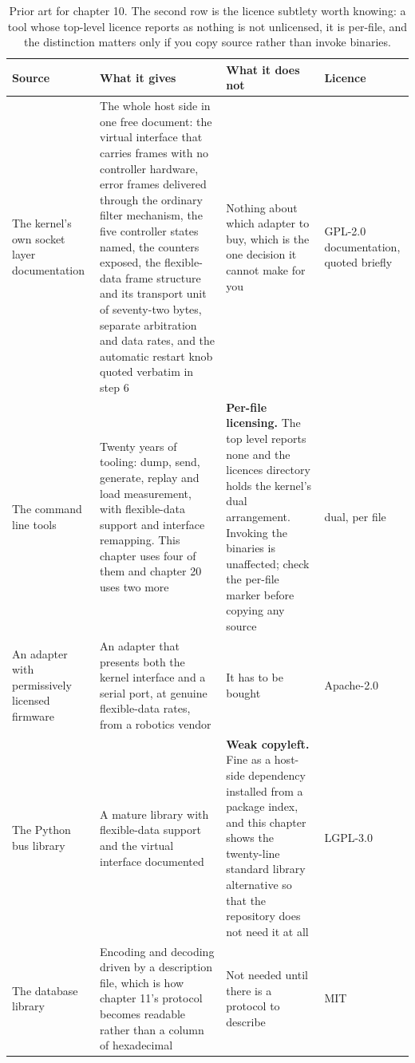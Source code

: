 \begin{table}[H]\centering\small
\begin{tabular}{p{34mm}p{46mm}p{38mm}p{20mm}}
\toprule
Source & What it gives & What it does not & Licence \\
\midrule
The kernel's own socket layer documentation & The whole host side in one free document: the virtual interface that carries frames with no controller hardware, error frames delivered through the ordinary filter mechanism, the five controller states named, the counters exposed, the flexible-data frame structure and its transport unit of seventy-two bytes, separate arbitration and data rates, and the automatic restart knob quoted verbatim in step 6 & Nothing about which adapter to buy, which is the one decision it cannot make for you & GPL-2.0 documentation, quoted briefly \\
The command line tools & Twenty years of tooling: dump, send, generate, replay and load measurement, with flexible-data support and interface remapping. This chapter uses four of them and chapter 20 uses two more & \textbf{Per-file licensing.} The top level reports none and the licences directory holds the kernel's dual arrangement. Invoking the binaries is unaffected; check the per-file marker before copying any source & dual, per file \\
An adapter with permissively licensed firmware & An adapter that presents both the kernel interface and a serial port, at genuine flexible-data rates, from a robotics vendor & It has to be bought & Apache-2.0 \\
The Python bus library & A mature library with flexible-data support and the virtual interface documented & \textbf{Weak copyleft.} Fine as a host-side dependency installed from a package index, and this chapter shows the twenty-line standard library alternative so that the repository does not need it at all & LGPL-3.0 \\
The database library & Encoding and decoding driven by a description file, which is how chapter 11's protocol becomes readable rather than a column of hexadecimal & Not needed until there is a protocol to describe & MIT \\
\bottomrule
\end{tabular}
\caption{Prior art for chapter 10. The second row is the licence subtlety worth knowing: a tool whose top-level licence reports as nothing is not unlicensed, it is per-file, and the distinction matters only if you copy source rather than invoke binaries.}
\end{table}

